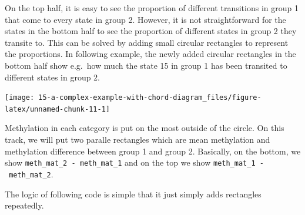 \documentclass[]{book}
\newenvironment{Shaded}{\begin{snugshade}}{\end{snugshade}}
\newcommand{\KeywordTok}[1]{\textcolor[rgb]{0.13,0.29,0.53}{\textbf{#1}}}
\newcommand{\DataTypeTok}[1]{\textcolor[rgb]{0.13,0.29,0.53}{#1}}
\newcommand{\DecValTok}[1]{\textcolor[rgb]{0.00,0.00,0.81}{#1}}
\newcommand{\StringTok}[1]{\textcolor[rgb]{0.31,0.60,0.02}{#1}}
\newcommand{\ControlFlowTok}[1]{\textcolor[rgb]{0.13,0.29,0.53}{\textbf{#1}}}
\newcommand{\OperatorTok}[1]{\textcolor[rgb]{0.81,0.36,0.00}{\textbf{#1}}}
\newcommand{\NormalTok}[1]{#1}
\theoremstyle{definition}
\theoremstyle{definition}
\theoremstyle{remark}
\begin{document}
On the top half, it is easy to see the proportion of different
transitions in group 1 that come to every state in group 2. However, it
is not straightforward for the states in the bottom half to see the
proportion of different states in group 2 they transite to. This can be
solved by adding small circular rectangles to represent the proportions.
In following example, the newly added circular rectangles in the bottom
half show e.g.~how much the state 15 in group 1 has been transited to
different states in group 2.

\begin{Shaded}
\end{Shaded}

\begin{center}\texttt{[image: 15-a-complex-example-with-chord-diagram\_files/figure-latex/unnamed-chunk-11-1]} \end{center}

Methylation in each category is put on the most outside of the circle.
On this track, we will put two paralle rectangles which are mean
methylation and methylation difference between group 1 and group 2.
Basically, on the bottom, we show \texttt{meth\_mat\_2\ -\ meth\_mat\_1}
and on the top we show \texttt{meth\_mat\_1\ -\ meth\_mat\_2}.

The logic of following code is simple that it just simply adds
rectangles repeatedly.
\end{document}
